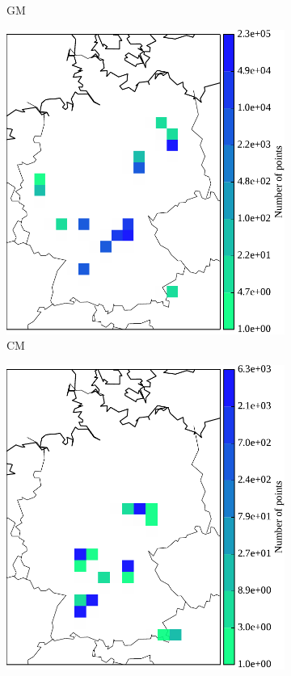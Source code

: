 \begin{figure}
\begin{subfigure}[b]{.23\textwidth}
		\caption{GM}
	\end{subfigure}
	\hfill
	\begin{subfigure}[b]{.23\textwidth}
	\centering
	\includegraphics[width=\textwidth]{pix/freq_COM_ger_oster.pdf}
		\caption{CM}
	\end{subfigure}
	\begin{subfigure}[b]{.23\textwidth}
	\centering
	\includegraphics[width=\textwidth]{pix/freq_RW_ger_oster.pdf}

\end{subfigure}
\end{figure}
